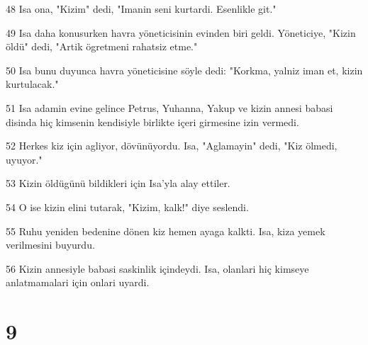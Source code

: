 \par 48 Isa ona, "Kizim" dedi, "Imanin seni kurtardi. Esenlikle git."
\par 49 Isa daha konusurken havra yöneticisinin evinden biri geldi. Yöneticiye, "Kizin öldü" dedi, "Artik ögretmeni rahatsiz etme."
\par 50 Isa bunu duyunca havra yöneticisine söyle dedi: "Korkma, yalniz iman et, kizin kurtulacak."
\par 51 Isa adamin evine gelince Petrus, Yuhanna, Yakup ve kizin annesi babasi disinda hiç kimsenin kendisiyle birlikte içeri girmesine izin vermedi.
\par 52 Herkes kiz için agliyor, dövünüyordu. Isa, "Aglamayin" dedi, "Kiz ölmedi, uyuyor."
\par 53 Kizin öldügünü bildikleri için Isa'yla alay ettiler.
\par 54 O ise kizin elini tutarak, "Kizim, kalk!" diye seslendi.
\par 55 Ruhu yeniden bedenine dönen kiz hemen ayaga kalkti. Isa, kiza yemek verilmesini buyurdu.
\par 56 Kizin annesiyle babasi saskinlik içindeydi. Isa, olanlari hiç kimseye anlatmamalari için onlari uyardi.

\chapter{9}

